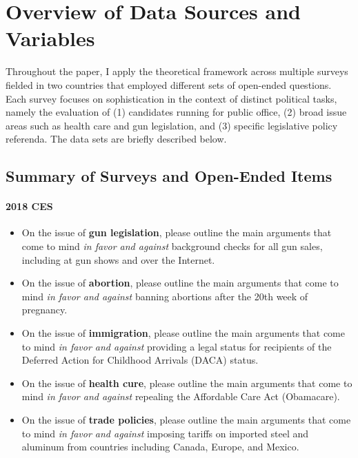 \section{Overview of Data Sources and Variables}\label{app:variables}

Throughout the paper, I apply the theoretical framework across multiple surveys fielded in two countries that employed different sets of open-ended questions. Each survey focuses on sophistication in the context of distinct political tasks, namely the evaluation of (1) candidates running for public office, (2) broad issue areas such as health care and gun legislation, and (3) specific legislative policy referenda. The data sets are briefly described below.


\subsection{Summary of Surveys and Open-Ended Items}

\paragraph{2018 CES}
\begin{itemize}
	\item On the issue of \textbf{gun legislation}, please outline the main arguments that come to mind \textit{in favor and against} background checks for all gun sales, including at gun shows and over the Internet.
	\item On the issue of \textbf{abortion}, please outline the main arguments that come to mind \textit{in favor and against} banning abortions after the 20th week of pregnancy.
	\item On the issue of \textbf{immigration}, please outline the main arguments that come to mind \textit{in favor and against} providing a legal status for recipients of the Deferred Action for Childhood Arrivals (DACA) status.
	\item On the issue of \textbf{health cure}, please outline the main arguments that come to mind \textit{in favor and against} repealing the Affordable Care Act (Obamacare).
	\item On the issue of \textbf{trade policies}, please outline the main arguments that come to mind \textit{in favor and against} imposing tariffs on imported steel and aluminum from countries including Canada, Europe, and Mexico.
\end{itemize}

